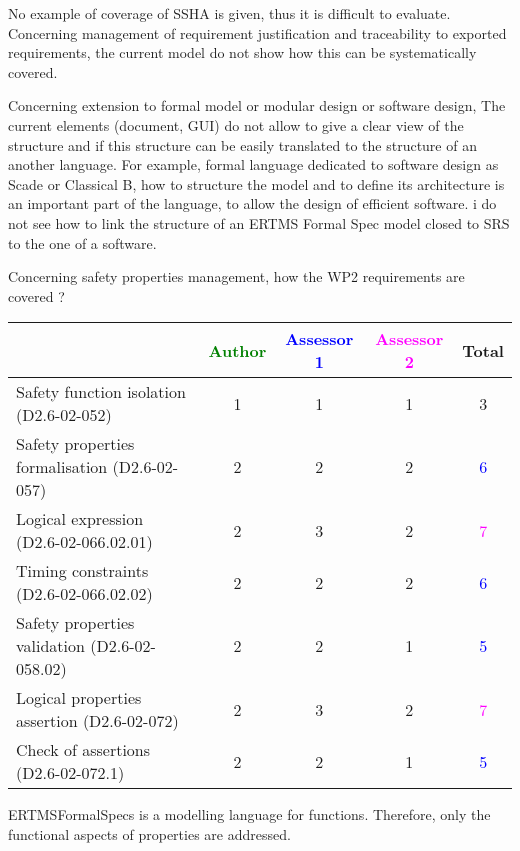 \begin{assessor2}
No example of coverage of SSHA is given, thus it is difficult to evaluate. Concerning management of requirement justification and traceability to exported requirements, the current model do not show how this can be systematically covered.

Concerning extension to formal model or modular design or software design, The current elements (document, GUI)  do not allow to give a clear view of the structure and if this structure can be easily translated to  the structure of an another language. For example, formal language dedicated to software design as Scade or Classical B, how to structure the model and to define its architecture is an important part of the language, to allow the design of efficient software. i do not see how to link the structure of an ERTMS Formal Spec model closed to SRS to  the one of a software.

\end{assessor2}


Concerning safety properties management, how the WP2 requirements are covered ?

\begin{tabular}{|l | c | c | c | c|}
\hline
& \textcolor{green}{Author} & \textcolor{blue}{Assessor 1} & \textcolor{magenta}{Assessor 2} & Total \\
\hline 
Safety function isolation (D2.6-02-052)  & 1    & 1    & 1    & 3    \\
\hline 
Safety properties formalisation (D2.6-02-057)  & 2    & 2    & 2    & \textcolor{blue}{6} \\
\hline
Logical expression (D2.6-02-066.02.01)  & 2    & 3    & 2    & \textcolor{magenta}{7} \\
\hline
Timing constraints (D2.6-02-066.02.02)  & 2    & 2    & 2    & \textcolor{blue}{6} \\
\hline
Safety properties validation (D2.6-02-058.02)  & 2    & 2    & 1    & \textcolor{blue}{5} \\
\hline
Logical properties assertion (D2.6-02-072)  & 2    & 3    & 2    & \textcolor{magenta}{7} \\
\hline
Check  of assertions (D2.6-02-072.1)  & 2    & 2    & 1    & \textcolor{blue}{5} \\
\hline
\end{tabular}

\begin{author_comment}
ERTMSFormalSpecs is a modelling language for functions. Therefore, only the functional aspects of properties are addressed.  
\end{author_comment}


